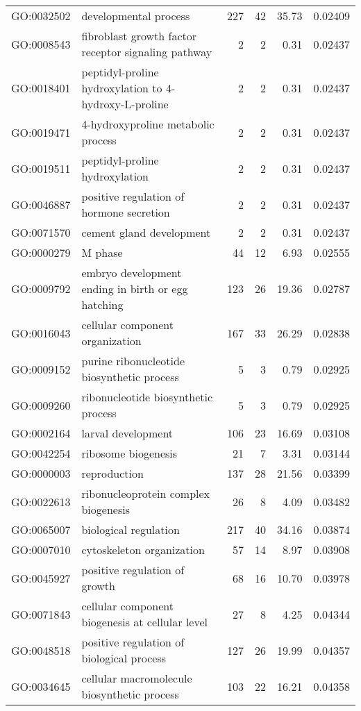 \begin{longtable}{lp{4.5cm}rrrl}
  GO:0032502 & developmental process & 227 &  42 & 35.73 & 0.02409 \\ 
  GO:0008543 & fibroblast growth factor receptor signaling pathway &   2 &   2 & 0.31 & 0.02437 \\ 
  GO:0018401 & peptidyl-proline hydroxylation to 4-hydroxy-L-proline &   2 &   2 & 0.31 & 0.02437 \\ 
  GO:0019471 & 4-hydroxyproline metabolic process &   2 &   2 & 0.31 & 0.02437 \\ 
  GO:0019511 & peptidyl-proline hydroxylation &   2 &   2 & 0.31 & 0.02437 \\ 
  GO:0046887 & positive regulation of hormone secretion &   2 &   2 & 0.31 & 0.02437 \\ 
  GO:0071570 & cement gland development &   2 &   2 & 0.31 & 0.02437 \\ 
  GO:0000279 & M phase &  44 &  12 & 6.93 & 0.02555 \\ 
  GO:0009792 & embryo development ending in birth or egg hatching & 123 &  26 & 19.36 & 0.02787 \\ 
  GO:0016043 & cellular component organization & 167 &  33 & 26.29 & 0.02838 \\ 
  GO:0009152 & purine ribonucleotide biosynthetic process &   5 &   3 & 0.79 & 0.02925 \\ 
  GO:0009260 & ribonucleotide biosynthetic process &   5 &   3 & 0.79 & 0.02925 \\ 
  GO:0002164 & larval development & 106 &  23 & 16.69 & 0.03108 \\ 
  GO:0042254 & ribosome biogenesis &  21 &   7 & 3.31 & 0.03144 \\ 
  GO:0000003 & reproduction & 137 &  28 & 21.56 & 0.03399 \\ 
  GO:0022613 & ribonucleoprotein complex biogenesis &  26 &   8 & 4.09 & 0.03482 \\ 
  GO:0065007 & biological regulation & 217 &  40 & 34.16 & 0.03874 \\ 
  GO:0007010 & cytoskeleton organization &  57 &  14 & 8.97 & 0.03908 \\ 
  GO:0045927 & positive regulation of growth &  68 &  16 & 10.70 & 0.03978 \\ 
  GO:0071843 & cellular component biogenesis at cellular level &  27 &   8 & 4.25 & 0.04344 \\ 
  GO:0048518 & positive regulation of biological process & 127 &  26 & 19.99 & 0.04357 \\ 
  GO:0034645 & cellular macromolecule biosynthetic process & 103 &  22 & 16.21 & 0.04358 \\ 

\end{longtable}
